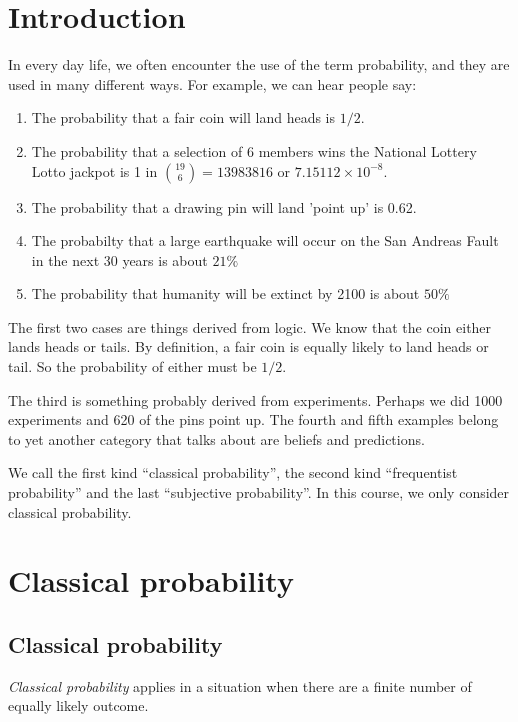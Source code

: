 \documentclass[a4paper]{article}
\begin{document}
\tableofcontents
\setcounter{section}{-1}
\section{Introduction}
In every day life, we often encounter the use of the term probability, and they are used in many different ways. For example, we can hear people say:
\begin{enumerate}
  \item The probability that a fair coin will land heads is $1/2$.
  \item The probability that a selection of 6 members wins the National Lottery Lotto jackpot is 1 in $\binom{19}{6} = 13 983 816$ or $7.15112\times 10^{-8}$.
  \item The probability that a drawing pin will land 'point up' is 0.62.
  \item The probabilty that a large earthquake will occur on the San Andreas Fault in the next 30 years is about $21\%$
  \item The probability that humanity will be extinct by 2100 is about $50\%$
\end{enumerate}
The first two cases are things derived from logic. We know that the coin either lands heads or tails. By definition, a fair coin is equally likely to land heads or tail. So the probability of either must be $1/2$.

The third is something probably derived from experiments. Perhaps we did 1000 experiments and 620 of the pins point up. The fourth and fifth examples belong to yet another category that talks about are beliefs and predictions.

We call the first kind ``classical probability'', the second kind ``frequentist probability'' and the last ``subjective probability''. In this course, we only consider classical probability.

\section{Classical probability}
\subsection{Classical probability}
\begin{defi}
  \emph{Classical probability} applies in a situation when there are a finite number of equally likely outcome.
\end{defi}
\end{document}
